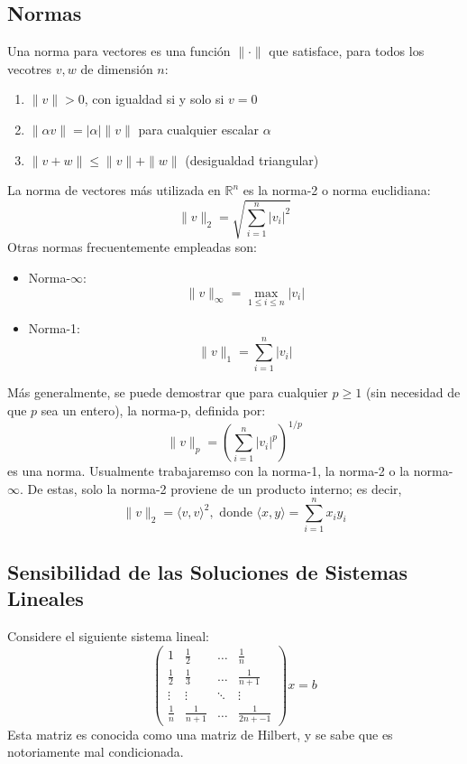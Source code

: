 \subsection{Normas}
\begin{definition}
Una norma para vectores es una función $\|\cdot\|$ que satisface, para todos los vecotres $v, w$ de dimensión $n$:
\begin{enumerate}
    \item $\|v\| > 0$, con igualdad si y solo si $v = 0$
    \item $\| \alpha v \| = |\alpha| \|v\|$ para cualquier escalar $\alpha$
    \item $\|v + w\| \leq \|v\| + \|w\|$ (desigualdad triangular)
\end{enumerate}

La norma de vectores más utilizada en $\mathbb{R}^n$ es la norma-2 o norma euclidiana:
\[ \|v\|_2 = \sqrt{\sum_{i = 1}^{n} |v_i|^2} \]
Otras normas frecuentemente empleadas son:
\begin{itemize}
    \item Norma-$\infty$:
    \[ \|v\|_\infty = \max_{1 \leq i \leq n} |v_i| \]
    \item Norma-1:
    \[ \|v\|_1 = \sum_{i = 1}^{n} |v_i| \]
\end{itemize}

Más generalmente, se puede demostrar que para cualquier $p \geq 1$ (sin necesidad de que $p$ sea un entero), la norma-p, definida por:
\[ \|v\|_p = \left( \sum_{i = 1}^{n}|v_i|^p \right)^{1/p} \]
es una norma. Usualmente trabajaremso con la norma-1, la norma-2 o la norma-$\infty$. De estas, solo la norma-2 proviene de un producto interno; es decir,
\[ \|v\|_2 = \langle v, v \rangle^2, \text{ donde } \langle x, y \rangle = \sum_{i = 1}^{n} x_iy_i\]
\end{definition}

\subsection{Sensibilidad de las Soluciones de Sistemas Lineales}
Considere el siguiente sistema lineal:
\[ \begin{pmatrix}
    1           &   \frac{1}{2} &   \dots   & \frac{1}{n} \\
    \frac{1}{2} &   \frac{1}{3} &   \dots   & \frac{1}{n+1} \\
    \vdots      &   \vdots      &   \ddots  &   \vdots \\
    \frac{1}{n} &   \frac{1}{n+1}   &    \dots  & \frac{1}{2n+-1}
\end{pmatrix} x = b \]
Esta matriz es conocida como una matriz de Hilbert, y se sabe que es notoriamente mal condicionada.

